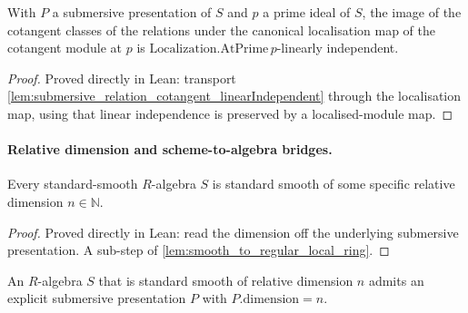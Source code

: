 \begin{lemma}
  \label{lem:submersive_relation_cotangent_linearIndependent_localized}
  With \(P\) a submersive presentation of \(S\) and \(p\) a prime ideal of \(S\), the
  image of the cotangent classes of the relations under the canonical localisation map
  of the cotangent module at \(p\) is \(\mathrm{Localization.AtPrime}\,p\)-linearly
  independent.
\end{lemma}

\begin{proof}
  Proved directly in Lean: transport
  \cref{lem:submersive_relation_cotangent_linearIndependent} through the localisation
  map, using that linear independence is preserved by a localised-module map.
\end{proof}

\paragraph{Relative dimension and scheme-to-algebra bridges.}

\begin{lemma}
  \label{lem:exists_standardSmoothOfRelativeDimension_of_standardSmooth}
  Every standard-smooth \(R\)-algebra \(S\) is standard smooth of some specific
  relative dimension \(n \in \mathbb N\).
\end{lemma}

\begin{proof}
  Proved directly in Lean: read the dimension off the underlying submersive
  presentation. A sub-step of \cref{lem:smooth_to_regular_local_ring}.
\end{proof}

\begin{lemma}
  \label{lem:exists_submersivePresentation_of_standardSmoothReldim}
  An \(R\)-algebra \(S\) that is standard smooth of relative dimension \(n\) admits an
  explicit submersive presentation \(P\) with \(P.\mathrm{dimension} = n\).
\end{lemma}

